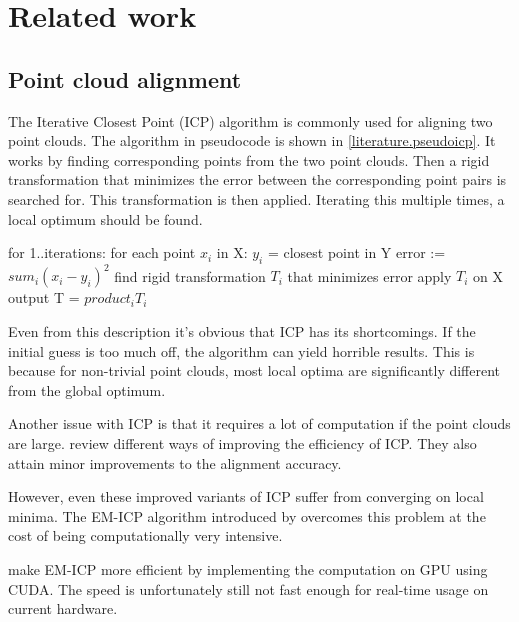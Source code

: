 \chapter{Related work}


\section{Point cloud alignment} \label{literature.alignment}


The Iterative Closest Point (ICP) algorithm is commonly used for aligning two point clouds.  The algorithm in pseudocode is shown in \ref{literature.pseudoicp}. It works by finding corresponding points from the two point clouds. Then a rigid transformation that minimizes the error between the corresponding point pairs is searched for. This transformation is then applied. Iterating this multiple times, a local optimum should be found.

\label{literature.pseudoicp}
for 1..iterations:
  for each point $x_i$ in X:
    $y_i$ = closest point in Y
  error := $sum_i (x_i-y_i)^2$
  find rigid transformation $T_i$ that minimizes error
  apply $T_i$ on X
output T = $product_i T_i$

Even from this description it's obvious that ICP has its shortcomings. If the initial guess is too much off, the algorithm can yield horrible results. This is because for non-trivial point clouds, most local optima are significantly different from the global optimum.

Another issue with ICP is that it requires a lot of computation if the point clouds are large. \citep{rusinkiewicz2001efficient} review different ways of improving the efficiency of ICP. They also attain minor improvements to the alignment accuracy.

However, even these improved variants of ICP suffer from converging on local minima. The EM-ICP  algorithm introduced by \citep{granger2006multi} overcomes this problem at the cost of being computationally very intensive. 

\citep{tamaki2010softassign} make EM-ICP more efficient by implementing the computation on GPU using CUDA. The speed is unfortunately still not fast enough for real-time usage on current hardware.

